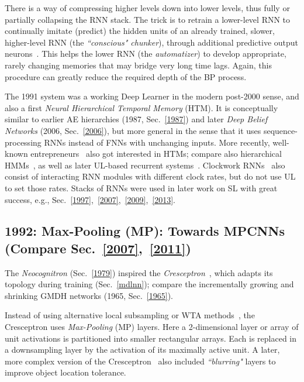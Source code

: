 \documentclass[letterpaper]{article}
\begin{document}
\begin{sloppypar}
There is a way of compressing higher levels down into lower levels, thus 
fully or partially collapsing the RNN stack. The trick is to retrain a lower-level RNN to continually imitate (predict) the hidden units of an already trained, slower, higher-level RNN (the {\em``conscious" chunker}), through additional predictive output neurons~\citep{chunker91and92}. This helps the lower RNN (the {\em automatizer}) to develop appropriate, rarely changing memories that may bridge very long time lags. Again, this procedure can greatly reduce the required depth of the BP process. 

The 1991 system was a working Deep Learner in the 
modern post-2000 sense, and also a first  {\em Neural Hierarchical Temporal Memory} (HTM).
It is conceptually similar to earlier AE hierarchies (1987, Sec.~\ref{1987}) and
 later {\em Deep Belief Networks}  (2006, Sec.~\ref{2006}), but more general in the sense that it uses sequence-processing RNNs instead of FNNs with unchanging inputs. 
More recently, well-known entrepreneurs~\citep{hawkins2006,kurzweil2012} also got interested in 
HTMs; compare also hierarchical HMMs~\citep[e.g.,][]{tishby1998},
as well as later UL-based recurrent 
systems~\citep{Klapper:01,steil2007,maass2013,young2014}.
Clockwork RNNs~\citep{icml2014} also consist 
of interacting RNN modules with different clock rates,
but do not use UL to set those rates. 
Stacks of RNNs were used in later work on SL with great success, 
e.g., Sec.~\ref{1997},~\ref{2007},~\ref{2009},~\ref{2013}.





\subsection{1992: Max-Pooling (MP): Towards MPCNNs (Compare Sec.~\ref{2007},~\ref{2011})}
\label{1999}

The {\em Neocognitron} (Sec.~\ref{1979}) inspired the
{\em Cresceptron}~\citep{weng1992}, which adapts its topology during training (Sec.~\ref{mdlnn});
compare the incrementally growing and shrinking 
 GMDH networks (1965, Sec.~\ref{1965}).

Instead of using alternative local subsampling or WTA 
methods~\citep[e.g.,][]{fukushima:1980,Schmidhuber:89cs,Maass2000,Fukushima:2013},
the Cresceptron uses {\em Max-Pooling} (MP) layers. Here 
a 2-dimensional layer or array of unit activations is partitioned into 
smaller rectangular arrays. Each is replaced in a downsampling layer by the activation of its maximally active unit.
A later, more complex version of the Cresceptron~\citep{weng1997} also included {\em ``blurring"} layers
to improve object location tolerance. 



\end{sloppypar}
\end{document}

